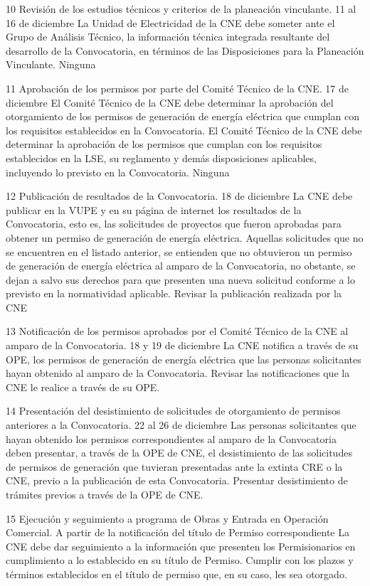  10
 Revisión de los estudios técnicos y criterios de la planeación vinculante.
 11 al 16 de diciembre
 La Unidad de Electricidad de la CNE debe someter ante el Grupo de Análisis Técnico, la información técnica integrada resultante del desarrollo de la Convocatoria, en términos de las Disposiciones para la Planeación Vinculante.
 Ninguna
 
 11
 Aprobación de los permisos por parte del Comité Técnico de la CNE.
 17 de diciembre
 El Comité Técnico de la CNE debe determinar la aprobación del otorgamiento de los permisos de generación de energía eléctrica que cumplan con los requisitos establecidos en la Convocatoria. El Comité Técnico de la CNE debe determinar la aprobación de los permisos que cumplan con los requisitos establecidos en la LSE, su reglamento y demás disposiciones aplicables, incluyendo lo previsto en la Convocatoria.
 Ninguna
 
 12
 Publicación de resultados de la Convocatoria.
 18 de diciembre
 La CNE debe publicar en la VUPE y en su página de internet los resultados de la Convocatoria, esto es, las solicitudes de proyectos que fueron aprobadas para obtener un permiso de generación de energía eléctrica.
Aquellas solicitudes que no se encuentren en el listado anterior, se entienden que no obtuvieron un permiso de generación de energía eléctrica al amparo de la Convocatoria, no obstante, se dejan a salvo sus derechos para que presenten una nueva solicitud conforme a lo previsto en la normatividad aplicable.
 Revisar la publicación realizada por la CNE
 
 13
 Notificación de los permisos aprobados por el Comité Técnico de la CNE al amparo de la Convocatoria.
 18 y 19 de diciembre
 La CNE notifica a través de su OPE, los permisos de generación de energía eléctrica que las personas solicitantes hayan obtenido al amparo de la Convocatoria.
 Revisar las notificaciones que la CNE le realice a través de su OPE.
 
 14
 Presentación del desistimiento de solicitudes de otorgamiento de permisos anteriores a la Convocatoria.
 22 al 26 de diciembre
 Las personas solicitantes que hayan obtenido los permisos correspondientes al amparo de la Convocatoria deben presentar, a través de la OPE de CNE, el desistimiento de las solicitudes de permisos de generación que tuvieran presentadas ante la extinta CRE o la CNE, previo a la publicación de esta Convocatoria.
 Presentar desistimiento de trámites previos a través de la OPE de CNE.
 
 15
 Ejecución y seguimiento a programa de Obras y Entrada en Operación Comercial.
 A partir de la notificación del título de Permiso correspondiente
 La CNE debe dar seguimiento a la información que presenten los Permisionarios en cumplimiento a lo establecido en su título de Permiso.
 Cumplir con los plazos y términos establecidos en el título de permiso que, en su caso, les sea otorgado.
 

